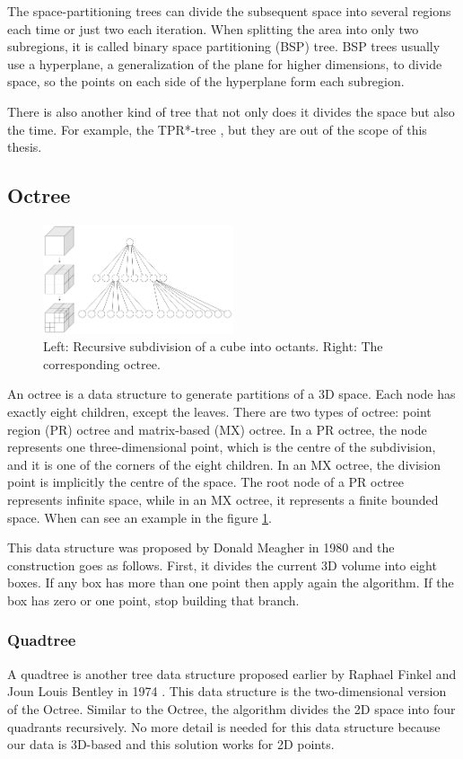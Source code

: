 The space-partitioning trees can divide the subsequent space into several regions each time or just two each iteration. When splitting the area into only two subregions, it is called binary space partitioning (BSP) tree. BSP trees usually use a hyperplane, a generalization of the plane for higher dimensions, to divide space, so the points on each side of the hyperplane form each subregion.

There is also another kind of tree that not only does it divides the space but also the time. For example, the TPR*-tree \cite{TPRtree}, but they are out of the scope of this thesis.

\subsection{Octree}
\begin{figure}
    \centering
    \includegraphics[width=0.5\textwidth]{figures/Octree.png}
    \caption{Left: Recursive subdivision of a cube into octants. Right: The corresponding octree. \cite{wiki:octree}}
    \label{fig:octree}
\end{figure}
An octree is a data structure to generate partitions of a 3D space. Each node has exactly eight children, except the leaves. There are two types of octree: point region (PR) octree and matrix-based (MX) octree. In a PR octree, the node represents one three-dimensional point, which is the centre of the subdivision, and it is one of the corners of the eight children. In an MX octree, the division point is implicitly the centre of the space. The root node of a PR octree represents infinite space, while in an MX octree, it represents a finite bounded space. When can see an example in the figure \ref{fig:octree}.

This data structure was proposed by Donald Meagher in 1980 \cite{Octree} and the construction goes as follows. First, it divides the current 3D volume into eight boxes. If any box has more than one point then apply again the algorithm. If the box has zero or one point, stop building that branch.

\subsubsection{Quadtree}
A quadtree is another tree data structure proposed earlier by Raphael Finkel and Joun Louis Bentley in 1974 \cite{Quadtree}. This data structure is the two-dimensional version of the Octree. Similar to the Octree, the algorithm divides the 2D space into four quadrants recursively. No more detail is needed for this data structure because our data is 3D-based and this solution works for 2D points.

